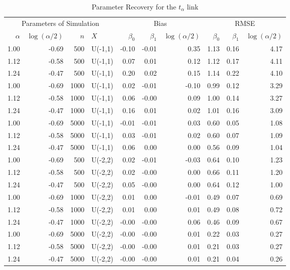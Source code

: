 \documentclass[a4paper,10 pt]{article}
\begin{document}
\begin{table}[ht]
\begin{center}
\caption{Parameter Recovery for the $t_\alpha$ link}
\label{talphatable}
\begin{tabular}{rrrlrrrrrr}
  \toprule
\multicolumn{4}{c}{Parameters of Simulation} & 	\multicolumn{3}{c}{Bias} & \multicolumn{3}{c}{RMSE} \\ \cmidrule(r){1-4} \cmidrule(rl){5-7} \cmidrule(l){8-10}  

$\alpha$ & $\log(\alpha/2)$ & $n$ & $X$ & $  \beta_0$ &   $\beta_1$ &   $\log(\alpha/2)$ & $   \beta_0$ &    $\beta_1$ &    $\log(\alpha/2)$ \\ 
  \midrule
1.00 & -0.69 & 500 & U(-1,1) & -0.10 & -0.01 & 0.35 & 1.13 & 0.16 & 4.17 \\ 
  1.12 & -0.58 & 500 & U(-1,1) & 0.07 & 0.01 & 0.12 & 1.12 & 0.17 & 4.11 \\ 
  1.24 & -0.47 & 500 & U(-1,1) & 0.20 & 0.02 & 0.15 & 1.14 & 0.22 & 4.10 \\ 
  1.00 & -0.69 & 1000 & U(-1,1) & 0.02 & -0.01 & -0.10 & 0.99 & 0.12 & 3.29 \\ 
  1.12 & -0.58 & 1000 & U(-1,1) & 0.06 & -0.00 & 0.09 & 1.00 & 0.14 & 3.27 \\ 
  1.24 & -0.47 & 1000 & U(-1,1) & 0.16 & 0.01 & 0.02 & 1.01 & 0.16 & 3.09 \\ 
  1.00 & -0.69 & 5000 & U(-1,1) & -0.01 & -0.01 & 0.03 & 0.60 & 0.05 & 1.08 \\ 
  1.12 & -0.58 & 5000 & U(-1,1) & 0.03 & -0.01 & 0.02 & 0.60 & 0.07 & 1.09 \\ 
  1.24 & -0.47 & 5000 & U(-1,1) & 0.06 & 0.00 & 0.00 & 0.56 & 0.09 & 1.04 \\ 
  1.00 & -0.69 & 500 & U(-2,2) & 0.02 & -0.01 & -0.03 & 0.64 & 0.10 & 1.23 \\ 
  1.12 & -0.58 & 500 & U(-2,2) & 0.02 & -0.00 & 0.00 & 0.66 & 0.11 & 1.20 \\ 
  1.24 & -0.47 & 500 & U(-2,2) & 0.05 & -0.00 & 0.00 & 0.64 & 0.12 & 1.00 \\ 
  1.00 & -0.69 & 1000 & U(-2,2) & 0.01 & 0.00 & -0.01 & 0.49 & 0.07 & 0.69 \\ 
  1.12 & -0.58 & 1000 & U(-2,2) & 0.01 & 0.00 & 0.01 & 0.49 & 0.08 & 0.72 \\ 
  1.24 & -0.47 & 1000 & U(-2,2) & -0.00 & -0.00 & 0.06 & 0.46 & 0.09 & 0.67 \\ 
  1.00 & -0.69 & 5000 & U(-2,2) & -0.00 & -0.00 & 0.01 & 0.22 & 0.03 & 0.27 \\ 
  1.12 & -0.58 & 5000 & U(-2,2) & -0.00 & -0.00 & 0.01 & 0.21 & 0.03 & 0.27 \\ 
  1.24 & -0.47 & 5000 & U(-2,2) & -0.00 & -0.00 & 0.01 & 0.21 & 0.04 & 0.26 \\ 
   \bottomrule
\end{tabular}
\end{center}
\end{table}



\printbibliography
\end{document}
